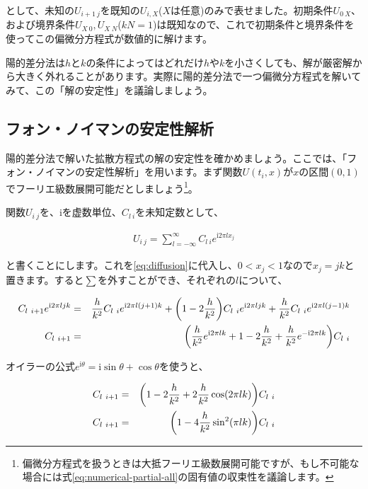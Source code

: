 \noindent
として、未知の$U_{i+1\ j}$を既知の$U_{i,X}$($X$は任意)のみで表せました。初期条件$U_{0\ X}$、および境界条件$U_{X\ 0},U_{X\ N}$($kN=1$)は既知なので、これで初期条件と境界条件を使ってこの偏微分方程式が数値的に解けます。

陽的差分法は$h$と$k$の条件によってはどれだけ$h$や$k$を小さくしても、解が厳密解から大きく外れることがあります。実際に陽的差分法で一つ偏微分方程式を解いてみて、この「解の安定性」を議論しましょう。











\subsection{フォン・ノイマンの安定性解析}
\label{explicit-stability}
陽的差分法で解いた拡散方程式の解の安定性を確かめましょう。ここでは、「フォン・ノイマンの安定性解析」を用います。まず関数$U(t_i,x)$が$x$の区間$(0,1)$でフーリエ級数展開可能だとしましょう\footnote{偏微分方程式を扱うときは大抵フーリエ級数展開可能ですが、もし不可能な場合には式\ref{eq:numerical-partial-all}の固有値の収束性を議論します。}。

関数$U_{i\ j}$を、$\mathrm{i}$を虚数単位、$C_{l\ i}$を未知定数として、

\begin{eqnarray}
    U_{i\ j}=\sum_{l=-\infty}^\infty C_{l\ i}e^{\mathrm{i}2\pi lx_j}
\end{eqnarray}

\noindent
と書くことにします。これを\ref{eq:diffusion}に代入し、$0<x_j<1$なので$x_j=jk$と置きます。すると$\sum$を外すことができ、それぞれの$l$について、

\begin{eqnarray}
    C_{l\ i+1}e^{\mathrm{i}2\pi ljk}&=&\frac{h}{k^2}C_{l\ i}e^{\mathrm{i}2\pi l(j+1)k}+\pqty{1-2\frac{h}{k^2}}C_{l\ i}e^{\mathrm{i}2\pi ljk}+\frac{h}{k^2}C_{l\ i}e^{\mathrm{i}2\pi l(j-1)k} \\
    C_{l\ i+1}&=&\pqty{\frac{h}{k^2}e^{\mathrm{i}2\pi lk}+1-2\frac{h}{k^2}+\frac{h}{k^2}e^{-\mathrm{i}2\pi lk}}C_{l\ i}
\end{eqnarray}


オイラーの公式$e^{\mathrm{i}\theta}=\mathrm{i}\sin\theta+\cos\theta$を使うと、

\begin{eqnarray}
    C_{l\ i+1}&=&\pqty{1-2\frac{h}{k^2}+2\frac{h}{k^2}\cos(2\pi lk)}C_{l\ i} \\
    C_{l\ i+1}&=&\pqty{1-4\frac{h}{k^2}\sin^2(\pi lk)}C_{l\ i}
    \label{eq:difference-stability}
\end{eqnarray}

